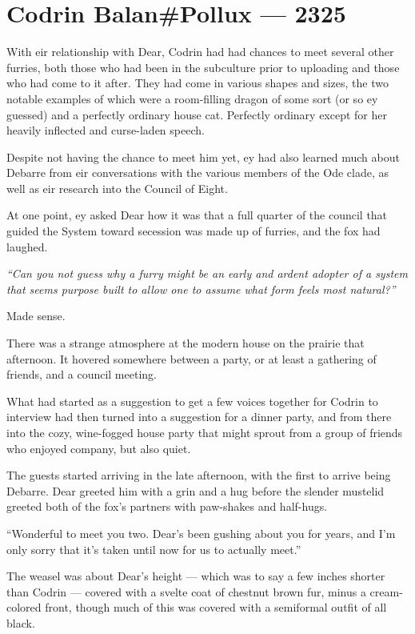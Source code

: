 \hypertarget{codrin-balanpollux-2325}{%
\chapter{Codrin Balan\#Pollux — 2325}\label{codrin-balanpollux-2325}}

With eir relationship with Dear, Codrin had had chances to meet several other furries, both those who had been in the subculture prior to uploading and those who had come to it after. They had come in various shapes and sizes, the two notable examples of which were a room-filling dragon of some sort (or so ey guessed) and a perfectly ordinary house cat. Perfectly ordinary except for her heavily inflected and curse-laden speech.

Despite not having the chance to meet him yet, ey had also learned much about Debarre from eir conversations with the various members of the Ode clade, as well as eir research into the Council of Eight.

At one point, ey asked Dear how it was that a full quarter of the council that guided the System toward secession was made up of furries, and the fox had laughed.

\emph{``Can you not guess why a furry might be an early and ardent adopter of a system that seems purpose built to allow one to assume what form feels most natural?''}

Made sense.

There was a strange atmosphere at the modern house on the prairie that afternoon. It hovered somewhere between a party, or at least a gathering of friends, and a council meeting.

What had started as a suggestion to get a few voices together for Codrin to interview had then turned into a suggestion for a dinner party, and from there into the cozy, wine-fogged house party that might sprout from a group of friends who enjoyed company, but also quiet.

The guests started arriving in the late afternoon, with the first to arrive being Debarre. Dear greeted him with a grin and a hug before the slender mustelid greeted both of the fox's partners with paw-shakes and half-hugs.

``Wonderful to meet you two. Dear's been gushing about you for years, and I'm only sorry that it's taken until now for us to actually meet.''

The weasel was about Dear's height — which was to say a few inches shorter than Codrin — covered with a svelte coat of chestnut brown fur, minus a cream-colored front, though much of this was covered with a semiformal outfit of all black.

